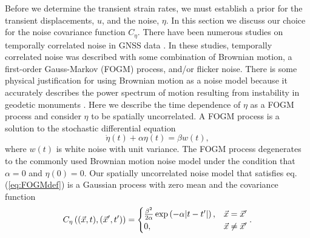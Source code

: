 \documentclass[extra,mreferee]{gji}
\begin{document}
Before we determine the transient strain rates, we must establish a
prior for the transient displacements, $u$, and the noise, $\eta$. In
this section we discuss our choice for the noise covariance function
$C_\eta$. There have been numerous studies on temporally correlated
noise in GNSS data \citep[e.g.,][]{Zhang1997, Mao1999, Williams2004,
Langbein2008}. In these studies, temporally correlated noise was
described with some combination of Brownian motion, a first-order
Gauss-Markov (FOGM) process, and/or flicker noise. There is some
physical justification for using Brownian motion as a noise model
because it accurately describes the power spectrum of motion resulting
from instability in geodetic monuments \citep[e.g.,][]{Wyatt1982,
Wyatt1989}. Here we describe the time dependence of $\eta$ as a FOGM
process and consider $\eta$ to be spatially uncorrelated. A FOGM
process is a solution to the stochastic differential equation
\begin{equation}\label{eq:FOGMdef}
\dot{\eta}(t) + \alpha \eta(t) = \beta w(t),
\end{equation}
where $w(t)$ is white noise with unit variance. The FOGM process
degenerates to the commonly used Brownian motion noise model under the
condition that $\alpha=0$ and $\eta(0) = 0$. Our spatially
uncorrelated noise model that satisfies eq. (\ref{eq:FOGMdef}) is a
Gaussian process with zero mean and the covariance function
\begin{equation}\label{eq:FOGM}
C_\eta\left((\vec{x},t),(\vec{x}',t')\right) = 
\begin{cases}
\frac{\beta^2}{2\alpha}\exp\left(-\alpha|t - t'|\right), &\vec{x} = \vec{x}' \\
0, &\vec{x} \neq \vec{x}'
\end{cases}. 
\end{equation}
\end{document}
